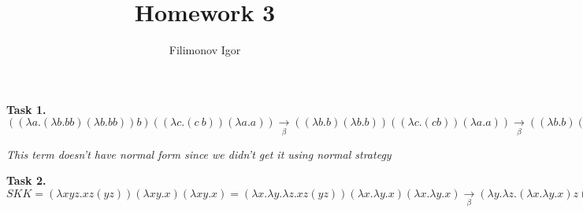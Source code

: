 \documentclass{article}
\title{Homework 3}
\author{Filimonov Igor}
\begin{document}
\maketitle
 
\textbf{Task 1.} 
 $ ((\lambda a.(\lambda b.b b) (\lambda b.b b)) b) ((\lambda c.(c\:b)) (\lambda a.a))\xrightarrow[\beta]{}((\lambda b.b)(\lambda b.b))((\lambda c.(c b))(\lambda a.a))\xrightarrow[\beta]{}((\lambda b.b)(\lambda b.b))((\lambda a.a) b)\xrightarrow[\beta]{}(\lambda b.b)(\lambda b.b) b$

\textit{This term doesn't have normal form since we didn't get it using normal strategy}

\textbf{Task 2.}
$ S K K = (\lambda x y z.x z (y z)) (\lambda x y.x) (\lambda x y.x) 
= (\lambda x.\lambda y.\lambda z.x z (y z))(\lambda x.\lambda y.x) (\lambda x.\lambda y.x)
\xrightarrow[\beta]{} (\lambda y.\lambda z.(\lambda x.\lambda y.x) z (y z)) (\lambda x.\lambda y.x)
\xrightarrow[\beta]{} \lambda z.(\lambda x.\lambda y.x) z ((\lambda x.\lambda y.x) z)
\xrightarrow[\beta]{} \lambda z.(\lambda x.\lambda y.x) z \lambda y.z
\xrightarrow[\beta]{} \lambda z.(\lambda y.z) \lambda y.z
\xrightarrow[\beta]{} \lambda z.z = I
$
\end{document}
